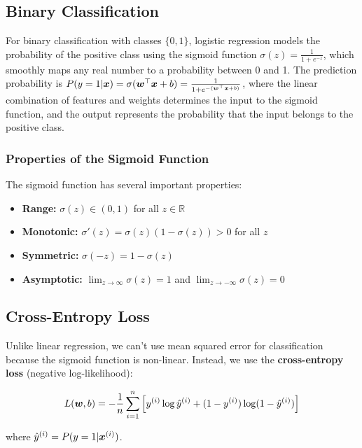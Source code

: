 \subsection{Binary Classification}

For binary classification with classes $\{0, 1\}$, logistic regression models the probability of the positive class using the sigmoid function $\sigma(z) = \frac{1}{1 + e^{-z}}$, which smoothly maps any real number to a probability between 0 and 1. The prediction probability is $P(y=1|\boldsymbol{x}) = \sigma(\boldsymbol{w}^\top \boldsymbol{x} + b) = \frac{1}{1 + e^{-(\boldsymbol{w}^\top \boldsymbol{x} + b)}}$, where the linear combination of features and weights determines the input to the sigmoid function, and the output represents the probability that the input belongs to the positive class.

\subsubsection{Properties of the Sigmoid Function}

The sigmoid function has several important properties:
\begin{itemize}
    \item \textbf{Range:} $\sigma(z) \in (0, 1)$ for all $z \in \mathbb{R}$
    \item \textbf{Monotonic:} $\sigma'(z) = \sigma(z)(1-\sigma(z)) > 0$ for all $z$
    \item \textbf{Symmetric:} $\sigma(-z) = 1 - \sigma(z)$
    \item \textbf{Asymptotic:} $\lim_{z \to \infty} \sigma(z) = 1$ and $\lim_{z \to -\infty} \sigma(z) = 0$
\end{itemize}

\subsection{Cross-Entropy Loss}

Unlike linear regression, we can't use mean squared error for classification because the sigmoid function is non-linear. Instead, we use the \textbf{cross-entropy loss} (negative log-likelihood):

\begin{equation}
L(\boldsymbol{w}, b) = -\frac{1}{n} \sum_{i=1}^{n} \left[y^{(i)} \log \hat{y}^{(i)} + (1-y^{(i)}) \log(1-\hat{y}^{(i)})\right]
\end{equation}

where $\hat{y}^{(i)} = P(y=1|\boldsymbol{x}^{(i)})$.

